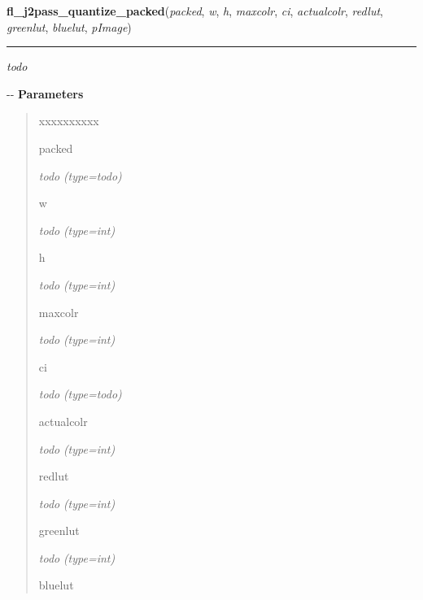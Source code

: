 \hspace{.8\funcindent}\begin{boxedminipage}{\funcwidth}

    \raggedright \textbf{fl\_j2pass\_quantize\_packed}(\textit{packed}, \textit{w}, \textit{h}, \textit{maxcolr}, \textit{ci}, \textit{actualcolr}, \textit{redlut}, \textit{greenlut}, \textit{bluelut}, \textit{pImage})

    \vspace{-1.5ex}

    \rule{\textwidth}{0.5\fboxrule}
\setlength{\parskip}{2ex}

\emph{todo}

-{}-
\setlength{\parskip}{1ex}
      \textbf{Parameters}
      \vspace{-1ex}

      \begin{quote}
        \begin{Ventry}{xxxxxxxxxx}

          \item[packed]


\emph{todo}
            {\it (type=\emph{todo})}

          \item[w]


\emph{todo}
            {\it (type=int)}

          \item[h]


\emph{todo}
            {\it (type=int)}

          \item[maxcolr]


\emph{todo}
            {\it (type=int)}

          \item[ci]


\emph{todo}
            {\it (type=\emph{todo})}

          \item[actualcolr]


\emph{todo}
            {\it (type=int)}

          \item[redlut]


\emph{todo}
            {\it (type=int)}

          \item[greenlut]


\emph{todo}
            {\it (type=int)}

          \item[bluelut]



\end{Ventry}
\end{quote}
\end{boxedminipage}
